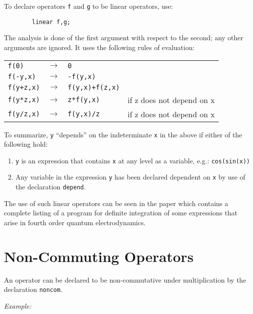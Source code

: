 To declare operators \texttt{f} and \texttt{g} to be linear operators,
use:
\begin{verbatim}
        linear f,g;
\end{verbatim}
The analysis is done of the first argument with respect to the second; any
other arguments are ignored. It uses the following rules of evaluation:
\begin{flushleft}
  \hspace{0.5in}%
  \begin{tabular}{llll}
    \texttt{f(0)}     & $\longrightarrow$ & \texttt{0} \\
    \texttt{f(-y,x)}  & $\longrightarrow$ & \texttt{-f(y,x)} \\
    \texttt{f(y+z,x)} & $\longrightarrow$ & \texttt{f(y,x)+f(z,x)} & \\
    \texttt{f(y*z,x)} & $\longrightarrow$ & \texttt{z*f(y,x)}      &
    if z does not depend on x \\
    \texttt{f(y/z,x)} & $\longrightarrow$ & \texttt{f(y,x)/z}      &
    if z does not depend on x
  \end{tabular}
\end{flushleft}
To summarize, \texttt{y} ``depends'' on the indeterminate \texttt{x} in the above
if either of the following hold:
\begin{enumerate}
\item \texttt{y} is an expression that contains \texttt{x} at any level as a
      variable, e.g.: \texttt{cos(sin(x))}

\item Any variable in the expression \texttt{y} has been declared dependent on
      \texttt{x} by use of the declaration \texttt{depend}.
\end{enumerate}
The use of such linear operators can be seen in the
paper \cite{Fox:74} which contains a complete listing of a program for definite
integration of some expressions that arise in fourth
order quantum electrodynamics.

\section{Non-Commuting Operators}
\hypertarget{command:NONCOM}{}
An operator can be declared to be non-commutative under multiplication by
the declaration \texttt{noncom}.

\textit{Example:}

